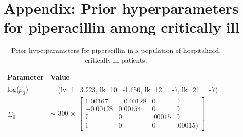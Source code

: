\documentclass{article}\usepackage[]{graphicx}\usepackage[]{color}
\begin{document}
\section{Appendix: Prior hyperparameters for piperacillin among critically ill}
\begin{center}
\begin{table}
\begin{tabular}{lll} \hline
Parameter & Value \\ \hline
log($\mu_0$) & = (lv_1=3.223, lk_10=-1.650, lk_12 = -7, lk_21 = -7)\\
$\Sigma_0$ & $\sim$ 300 $\times$ $\begin{bmatrix} 0.00167 & -0.00128 & 0 & 0\\
                                -0.00128 & 0.00154 &      0 &      0 \\
                                       0 &       0 & .00015 &      0 \\
                                       0 &       0 &      0 & .00015)\end{bmatrix}$ \\ %
\hline
\end{tabular}
\caption{Prior hyperparameters for piperacillin in a population of hospitalized, critically ill patients.}\label{tab:hyp}
\end{table}
\end{center}
\end{document}
